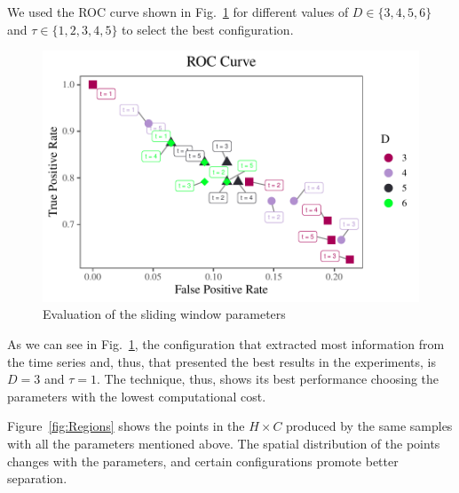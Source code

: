 \documentclass[journal]{IEEEtran}
\begin{document}
We used the ROC curve shown in Fig.~\ref{fig:ROC} for different values of $D \in \{3, 4, 5, 6 \} $ and $\tau \in \{1, 2, 3, 4, 5 \}$ to select the best configuration.

\begin{figure}[hbt]
	\includegraphics[width=\columnwidth]{Figures/ROC.pdf}
	\caption{Evaluation of the sliding window parameters}
	\label{fig:ROC}
\end{figure} 

As we can see in Fig.~\ref{fig:ROC}, the configuration that extracted most information from the time series and, thus, that presented the best results in the experiments, is $D = 3$ and $\tau = 1$.
The technique, thus, shows its best performance choosing the parameters with the lowest computational cost.

Figure~\ref{fig:Regions} shows the points in the $H\times C$ produced by the same samples with all the parameters mentioned above.
The spatial distribution of the points changes with the parameters,
and certain configurations promote better separation.
\end{document}
